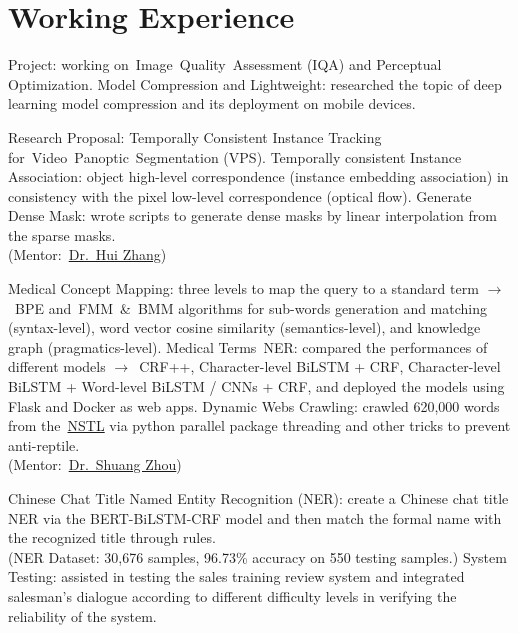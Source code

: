 \documentclass{my_cv}
\begin{document}
\hspace*{\fill}


\section{\textbf{Working Experience}}
\workitemstwo
{Project: working on~\textsc{I}mage~\textsc{Q}uality~\textsc{A}ssessment (\textsc{IQA}) and Perceptual Optimization.}
{Model Compression and Lightweight: researched the topic of deep learning model compression and its deployment on mobile devices.}

\workitemsthree
{Research Proposal: Temporally Consistent Instance Tracking for~\textsc{V}ideo~\textsc{P}anoptic~\textsc{S}egmentation (\textsc{VPS}).}
{Temporally consistent Instance Association: object high-level correspondence (instance embedding association) in consistency with the pixel low-level correspondence (optical flow).}
{Generate Dense Mask: wrote scripts to generate dense masks by linear interpolation from the sparse masks.\\(Mentor:~\href{mailto: hui123.zhang@samsung.com}{Dr.~Hui Zhang})}

\workitemsthree
{Medical Concept Mapping: three levels to map the query to a standard term $\rightarrow$~\textsc{BPE} and~\textsc{FMM}~\&~\textsc{BMM} algorithms for sub-words generation and matching (syntax-level), word vector cosine similarity (semantics-level), and knowledge graph (pragmatics-level).}
{Medical Terms~\textsc{NER}: compared the performances of different models $\rightarrow$~\textsc{CRF}++, Character-level BiLSTM + \textsc{CRF}, Character-level BiLSTM + Word-level BiLSTM / CNNs + \textsc{CRF}, and deployed the models using Flask and Docker as web apps.}
{Dynamic Webs Crawling: crawled 620,000 words from the~\href{https://www.nstl.gov.cn/stkos.html?t=Concept&q=}{\textsc{NSTL}} via python parallel package threading and other tricks to prevent anti-reptile.\\(Mentor:~\href{mailto: shuang.zhou@philips.com}{Dr.~Shuang Zhou})}

\workitemstwo
{Chinese Chat Title Named Entity Recognition (\textsc{NER}): create a Chinese chat title \textsc{NER} via the BERT-BiLSTM-CRF model and then match the formal name with the recognized title through rules. \\ 
(\textsc{NER} Dataset: 30,676 samples, 96.73\% accuracy on 550 testing samples.)}
{System Testing: assisted in testing the sales training review system and integrated salesman’s dialogue according to different difficulty levels in verifying the reliability of the system.}
\end{document}
